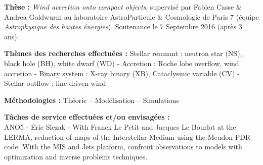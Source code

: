\documentclass[11pt]{article}
\begin{document}
\vspace{-0.2cm}
{\bf Th\`ese :} \textit{Wind accretion onto compact objects}, supervis\'e par Fabien Casse \& Andrea Goldwurm au laboratoire AstroParticule \& Cosmologie de Paris 7 (\'equipe \textit{Astrophysique des hautes \'energies}). Soutenance le 7 Septembre 2016 (apr\`es 3 ans). 



\vspace{0.2cm}
{\bf Th\`emes des recherches effectu\'ees : } Stellar remnant : neutron star (NS), black hole (BH), white dwarf (WD) - Accretion : Roche lobe overflow, wind accretion - Binary system : X-ray binary (XB), Cataclysmic variable (CV) - Stellar outflow : line-driven wind


\vspace{0.3cm}


{\bf M\'ethodologies :}  
Th\'eorie --  Mod\'elisation -- Simulations

\vspace{0.3cm}

{\bf T\^{a}ches de service effectu\'ees et/ou envisag\'ees :}\\
ANO5 - Eric Slezak - With Franck Le Petit and Jacques Le Bourlot at the LERMA, reduction of maps of the Interstellar Medium using the Meudon PDR code. With the MIS and Jets platform, confront observations to models with optimization and inverse problems techniques.\\

\vspace{-0.1cm}
\end{document}
